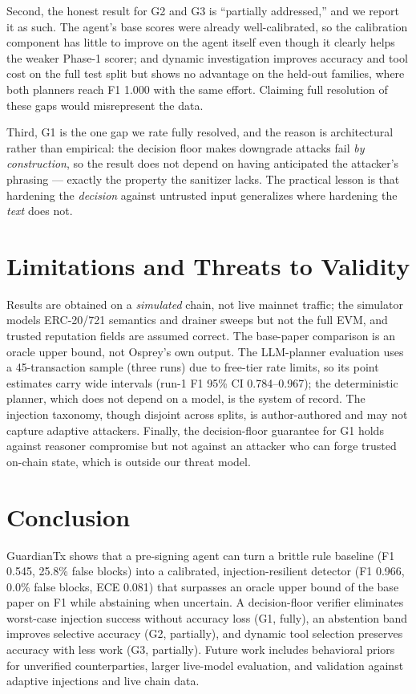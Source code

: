\documentclass[conference]{IEEEtran}
\begin{document}
Second, the honest result for G2 and G3 is ``partially addressed,'' and we report it
as such. The agent's base scores were already well-calibrated, so the calibration
component has little to improve on the agent itself even though it clearly helps the
weaker Phase-1 scorer; and dynamic investigation improves accuracy and tool cost on
the full test split but shows no advantage on the held-out families, where both
planners reach F1 1.000 with the same effort. Claiming full resolution of these gaps
would misrepresent the data.

Third, G1 is the one gap we rate fully resolved, and the reason is architectural
rather than empirical: the decision floor makes downgrade attacks fail \emph{by
construction}, so the result does not depend on having anticipated the attacker's
phrasing --- exactly the property the sanitizer lacks. The practical lesson is that
hardening the \emph{decision} against untrusted input generalizes where hardening the
\emph{text} does not.

\section{Limitations and Threats to Validity}
Results are obtained on a \emph{simulated} chain, not live mainnet traffic; the
simulator models ERC-20/721 semantics and drainer sweeps but not the full EVM, and
trusted reputation fields are assumed correct. The base-paper comparison is an oracle
upper bound, not Osprey's own output. The LLM-planner evaluation uses a 45-transaction
sample (three runs) due to free-tier rate limits, so its point estimates carry wide
intervals (run-1 F1 95\% CI 0.784--0.967); the deterministic planner, which does not depend on a model, is the system
of record. The injection taxonomy, though disjoint across splits, is author-authored
and may not capture adaptive attackers. Finally, the decision-floor guarantee for G1
holds against reasoner compromise but not against an attacker who can forge trusted
on-chain state, which is outside our threat model.

\section{Conclusion}
GuardianTx shows that a pre-signing agent can turn a brittle rule baseline (F1 0.545,
25.8\% false blocks) into a calibrated, injection-resilient detector (F1 0.966, 0.0\%
false blocks, ECE 0.081) that surpasses an oracle upper bound of the base paper on
F1 while abstaining when uncertain. A decision-floor verifier eliminates worst-case
injection success without accuracy loss (G1, fully), an abstention band improves
selective accuracy (G2, partially), and dynamic tool selection preserves accuracy
with less work (G3, partially). Future work includes behavioral priors for unverified
counterparties, larger live-model evaluation, and validation against adaptive
injections and live chain data.
\end{document}
